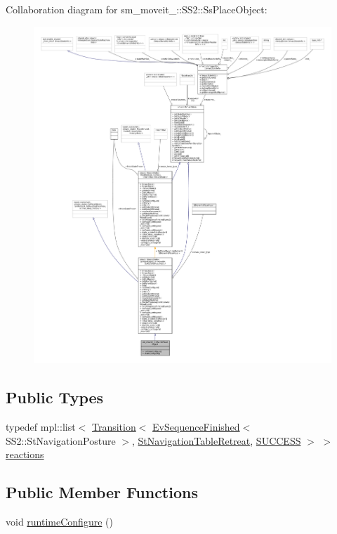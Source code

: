 Collaboration diagram for sm\+\_\+moveit\+\_\+:\+:S\+S2\+:\+:Ss\+Place\+Object\+:
\nopagebreak
\begin{figure}[H]
\begin{center}
\leavevmode
\includegraphics[width=350pt]{structsm__moveit__4_1_1SS2_1_1SsPlaceObject__coll__graph}
\end{center}
\end{figure}
\subsection*{Public Types}
\begin{DoxyCompactItemize}
\item 
typedef mpl\+::list$<$ \hyperlink{classsmacc_1_1Transition}{Transition}$<$ \hyperlink{structsmacc_1_1default__events_1_1EvSequenceFinished}{Ev\+Sequence\+Finished}$<$ S\+S2\+::\+St\+Navigation\+Posture $>$, \hyperlink{structsm__moveit__4_1_1StNavigationTableRetreat}{St\+Navigation\+Table\+Retreat}, \hyperlink{structsmacc_1_1default__transition__tags_1_1SUCCESS}{S\+U\+C\+C\+E\+SS} $>$ $>$ \hyperlink{structsm__moveit__4_1_1SS2_1_1SsPlaceObject_a51693005763762aec9f908f0a624ee87}{reactions}
\end{DoxyCompactItemize}
\subsection*{Public Member Functions}
\begin{DoxyCompactItemize}
\item 
void \hyperlink{structsm__moveit__4_1_1SS2_1_1SsPlaceObject_a930b4228defad612e6fe391e78345819}{runtime\+Configure} ()
\end{DoxyCompactItemize}
